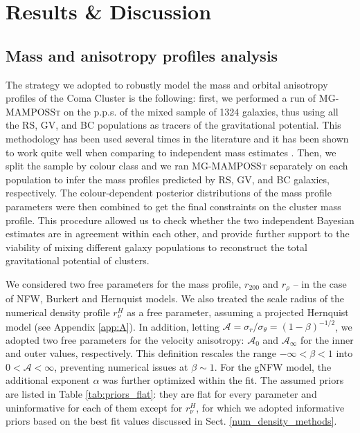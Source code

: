 \documentclass{aa}
\begin{document}

\section{Results \& Discussion}
\label{results}




\subsection{Mass and anisotropy profiles analysis}
\label{full_sample_mamposst}

The strategy we adopted to robustly model the mass and orbital anisotropy profiles of the Coma Cluster is the following: first, we performed a run of \textsc{MG-MAMPOSSt} on the p.p.s. of the mixed sample of 1324 galaxies, thus using all the RS, GV, and BC populations as tracers of the gravitational potential. This methodology has been used several times in the literature and it has been shown to work quite well when comparing to independent mass estimates \citep[\textit{e.g.}][]{Sartoris_2020, Biviano_2013, Biviano_2023}. Then, we split the sample by colour class and we ran \textsc{MG-MAMPOSSt} separately on each population to infer the mass profiles predicted by RS, GV, and BC galaxies, respectively. The colour-dependent posterior distributions of the mass profile parameters were then combined to get the final constraints on the cluster mass profile. This procedure allowed us to check whether the two independent Bayesian estimates are in agreement within each other, and provide further support to the viability of mixing different galaxy populations to reconstruct the total gravitational potential of clusters. 
\medskip

We considered two free parameters for the mass profile, $r_{200}$ and $r_\rho$ -- in the case of NFW, Burkert and Hernquist models. We also treated the scale radius of the numerical density profile $r_\nu^H$ as a free parameter, assuming a projected Hernquist model (see Appendix \ref{app:A}). In addition, letting $\mathcal{A}=\sigma_r /\sigma_\theta = (1-\beta)^{-1/2}$, we adopted two free parameters for the velocity anisotropy: $\mathcal{A}_0$ and $\mathcal{A_{\infty}}$ for the inner and outer values, respectively. This definition rescales the range $-\infty < \beta < 1$ into $0 < \mathcal{A} < \infty$, preventing numerical issues at $\beta \sim 1$. For the gNFW model, the additional exponent $\alpha$ was further optimized within the fit. The assumed priors are listed in Table \ref{tab:priors_flat}: they are flat for every parameter and uninformative for each of them except for $r_\nu^H$, for which we adopted informative priors based on the best fit values discussed in Sect. \ref{num_density_methods}.
\end{document}

